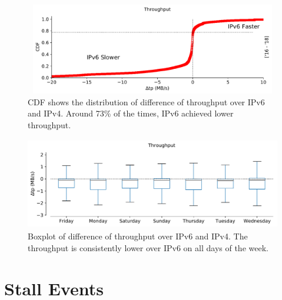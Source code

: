 \begin{figure}[!ht]
	\centering
	\includegraphics[keepaspectratio, height=4cm, width=15cm]{figures/throughput/netflix-throughput-difference.pdf}
	\caption[Throughput CDF]{CDF shows the distribution of difference of throughput over IPv6 and IPv4. Around 73\% of the times, IPv6 achieved lower throughput.}
	\label{fig:Throughput CDF}
\end{figure} 
\begin{figure}[!ht]
	\centering
	\includegraphics[keepaspectratio, height=4cm, width=15cm]{figures/throughput/netflix-throughput-boxplot-by-days.pdf}
	\caption[Throughput Boxplot by Days]{Boxplot of difference of throughput over IPv6 and IPv4. The throughput is consistently lower over IPv6 on all days of the week.}
	\label{fig:Throughput Boxplot by Days}
\end{figure}

\FloatBarrier

\section{Stall Events}

